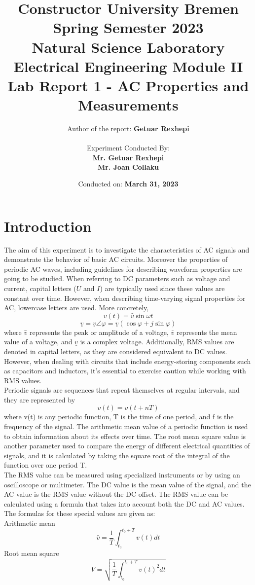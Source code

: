 \documentclass[12pt]{report}
\title{
    \textbf{Constructor University Bremen} \\
Spring Semester 2023 \\
\vspace{1cm}
\textbf{Natural Science Laboratory\\
Electrical Engineering Module II\\}
    \vspace{1cm}
    \textbf{Lab Report 1 - AC Properties and Measurements} \\ 
    
}
\author{
    Author of the report: \textbf{Getuar Rexhepi} \\
    \vspace{1cm} \\
    Experiment Conducted By: \\ \textbf{Mr. Getuar Rexhepi} \\
\textbf{Mr. Joan Collaku}
}
\date{Conducted on: \textbf{March 31, 2023}}
\begin{document}
\maketitle

\chapter{Introduction}
The aim of this experiment is to investigate the characteristics of AC signals and demonstrate the behavior of basic AC circuits.  Moreover the properties of periodic AC waves, including guidelines for describing waveform properties are going to be studied. When referring to DC parameters such as voltage and current, capital letters ($U$ and $I$) are typically used since these values are constant over time. However, when describing time-varying signal properties for AC, lowercase letters are used. More concretely, $$v(t) = \hat{v} \sin \omega t $$   $$\underline{v} = \underline{v} \angle \varphi = \underline{v}(\cos \varphi + j \sin \varphi)$$ where $\hat{v}$ represents the peak or amplitude of a voltage, $\bar{v}$ represents the mean value of a voltage, and $\underline{v}$ is a complex voltage. Additionally, RMS values are denoted in capital letters, as they are considered equivalent to DC values. However, when dealing with circuits that include energy-storing components such as capacitors and inductors, it's essential to exercise caution while working with RMS values. \\
Periodic signals are sequences that repeat themselves at regular intervals, and they are represented by $$ v(t) = v(t + nT)$$ where v(t) is any periodic function, T is the time of one period, and f is the frequency of the signal. The arithmetic mean value of a periodic function is used to obtain information about its effects over time. The root mean square value is another parameter used to compare the energy of different electrical quantities of signals, and it is calculated by taking the square root of the integral of the function over one period T.\\
The RMS value can be measured using specialized instruments or by using an oscilloscope or multimeter. The DC value is the mean value of the signal, and the AC value is the RMS value without the DC offset. The RMS value can be calculated using a formula that takes into account both the DC and AC values. The formulas for these special values are given as: \\
Arithmetic mean $$ \bar{v} = \frac{1}{T} \int_{t_0}^{t_0+T}v(t)dt $$
Root mean square $$ V=\sqrt{\frac{1}{T}\int_{t_0}^{t_0+T}v(t)^2 dt} $$
\end{document}
